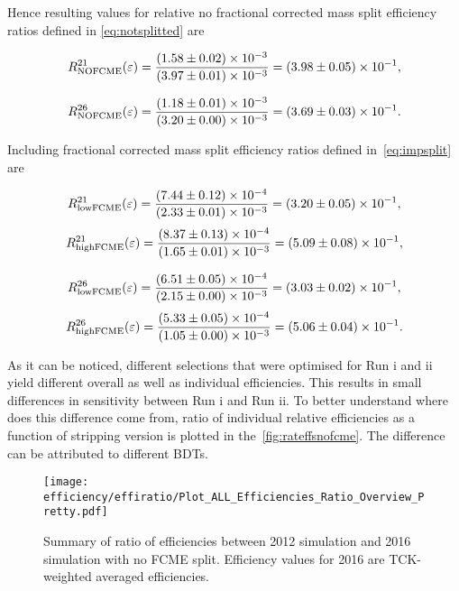 Hence resulting values for relative no fractional corrected mass split efficiency ratios defined in \autoref{eq:notsplitted} are

\begin{equation}
	R^{21}_{\rm{NOFCME}}(\varepsilon)=\frac{(1.58\pm0.02)\times 10 ^{-3 }}{(3.97\pm0.01)\times 10 ^{-3 }}=(3.98\pm0.05)\times 10 ^{-1 },
\end{equation}

\begin{equation}
	R^{26}_{\rm{NOFCME}}(\varepsilon)=\frac{(1.18\pm0.01)\times 10 ^{-3 }}{(3.20\pm0.00)\times 10 ^{-3 }}=(3.69\pm0.03)\times 10 ^{-1 }.
\end{equation}


Including fractional corrected mass split efficiency ratios defined in~\autoref{eq:impsplit} are

\begin{equation}
	R^{21}_{\rm{lowFCME}}(\varepsilon)=\frac{(7.44\pm0.12)\times 10 ^{-4 }}{(2.33\pm0.01)\times 10 ^{-3 }}=(3.20\pm0.05)\times 10 ^{-1 },
\end{equation}
\begin{equation}
	R^{21}_{\rm{highFCME}}(\varepsilon)=\frac{(8.37\pm0.13)\times 10 ^{-4 }}{(1.65\pm0.01)\times 10 ^{-3 }}=(5.09\pm0.08)\times 10 ^{-1 },
\end{equation}

\begin{equation}
	R^{26}_{\rm{lowFCME}}(\varepsilon)=\frac{(6.51\pm0.05)\times 10 ^{-4 }}{(2.15\pm0.00)\times 10 ^{-3 }}=(3.03\pm0.02)\times 10 ^{-1 },
\end{equation}
\begin{equation}
	R^{26}_{\rm{highFCME}}(\varepsilon)=\frac{(5.33\pm0.05)\times 10 ^{-4 }}{(1.05\pm0.00)\times 10 ^{-3 }}=(5.06\pm0.04)\times 10 ^{-1 }.
\end{equation}
	
	
As it can be noticed, different selections that were optimised for Run \Rn{1} and \Rn{2} yield different overall as well as individual efficiencies. This results in small differences in sensitivity between Run \Rn{1} and Run \Rn{2}. To better understand where does this difference come from, ratio of individual relative efficiencies as a function of stripping version is plotted in the~\autoref{fig:rateffsnofcme}. The difference can be attributed to different BDTs.

\begin{figure}[H]
\centering
\texttt{[image: efficiency/effiratio/Plot\_ALL\_Efficiencies\_Ratio\_Overview\_Pretty.pdf]}
\caption{Summary of ratio of efficiencies between 2012 simulation and 2016 simulation with no FCME split. Efficiency values for 2016 are TCK-weighted averaged efficiencies.}
\centering
\label{fig:rateffsnofcme}
\end{figure}


